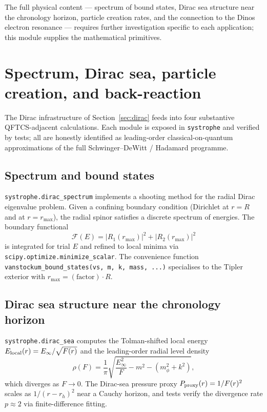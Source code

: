 \documentclass[11pt,a4paper]{article}
\begin{document}
The full physical content --- spectrum of bound states, Dirac sea
structure near the chronology horizon, particle creation rates, and
the connection to the Dinos electron resonance --- requires further
investigation specific to each application; this module supplies the
mathematical primitives.

\section{Spectrum, Dirac sea, particle creation, and back-reaction}
\label{sec:qftcs}

The Dirac infrastructure of Section~\ref{sec:dirac} feeds into four
substantive QFTCS-adjacent calculations. Each module is exposed in
\texttt{systrophe} and verified by tests; all are honestly identified
as leading-order classical-on-quantum approximations of the full
Schwinger--DeWitt / Hadamard programme.

\subsection{Spectrum and bound states}

\texttt{systrophe.dirac\_spectrum} implements a shooting method for
the radial Dirac eigenvalue problem. Given a confining boundary
condition (Dirichlet at $r = R$ and at $r = r_{\max}$), the radial
spinor satisfies a discrete spectrum of energies. The boundary
functional
\begin{equation}
\mathcal{F}(E) = \lvert R_1(r_{\max}) \rvert^2 + \lvert R_2(r_{\max}) \rvert^2
\end{equation}
is integrated for trial $E$ and refined to local minima via
\texttt{scipy.optimize.minimize\_scalar}. The convenience function
\texttt{vanstockum\_bound\_states(vs, m, k, mass, ...)} specialises to
the Tipler exterior with $r_{\max} = (\text{factor}) \cdot R$.

\subsection{Dirac sea structure near the chronology horizon}

\texttt{systrophe.dirac\_sea} computes the Tolman-shifted local energy
$E_{\rm local}(r) = E_\infty / \sqrt{F(r)}$ and the leading-order
radial level density
\begin{equation}
\rho(F) = \frac{1}{\pi}\sqrt{\frac{E_\infty^2}{F} - m^2 - (m_\phi^2 + k^2)},
\end{equation}
which diverges as $F \to 0$. The Dirac-sea pressure proxy
$P_{\rm proxy}(r) = 1/F(r)^2$ scales as $1/(r - r_h)^2$ near a Cauchy
horizon, and tests verify the divergence rate $p \approx 2$ via
finite-difference fitting.
\end{document}
